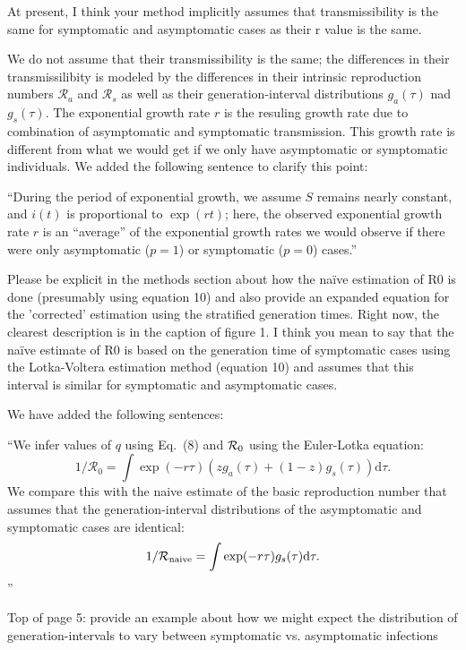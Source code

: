 \documentclass[12pt]{article}
\newcommand{\revtext}{\textsf}
\begin{document}
\revtext{At present, I think your method implicitly assumes that transmissibility is the same for symptomatic and asymptomatic cases as their r value is the same.}

We do not assume that their transmissibility is the same; the differences in their transmissilibity is modeled by the differences in their intrinsic reproduction numbers $\mathcal R_a$ and $\mathcal R_s$ as well as their generation-interval distributions $g_a(\tau)$ nad $g_s(\tau)$. The exponential growth rate $r$ is the resuling growth rate due to combination of asymptomatic and symptomatic transmission. This growth rate is different from what we would get if we only have asymptomatic or symptomatic individuals. We added the following sentence to clarify this point:

``During the period of exponential growth, we assume $S$ remains nearly constant, and $i(t)$ is proportional to $\exp(r t)$;
here, the observed exponential growth rate $r$ is an ``average'' of the exponential growth rates we would observe if there were only asymptomatic ($p=1$) or symptomatic ($p=0$) cases.''

\revtext{Please be explicit in the methods section about how the naïve estimation of R0 is done (presumably using equation 10) and also provide an expanded equation for the 'corrected' estimation using the stratified generation times. Right now, the clearest description is in the caption of figure 1.  I think you mean to say that the naïve estimate of R0 is based on the generation time of symptomatic cases using the Lotka-Voltera estimation method (equation 10) and assumes that this interval is similar for symptomatic and asymptomatic cases.}

We have added the following sentences:

``We infer values of $q$ using Eq.~(8) and ${\cal{R}}_0$ using the Euler-Lotka equation:
\begin{equation}
1/\mathcal R_0 = \int \exp(-r \tau) \left(z g_a(\tau) + (1-z) g_s(\tau)\right) \mathrm{d} \tau.
\end{equation}
We compare this with the naive estimate of the basic reproduction number that assumes that the generation-interval distributions of the asymptomatic and symptomatic cases are identical:
\begin{equation}
1/\mathcal R_{\tiny \textrm{naive}} = \int \exp(-r \tau) g_s(\tau) \mathrm{d} \tau.
\end{equation}''

\revtext{Top of page 5: provide an example about how we might expect the distribution of generation-intervals to vary between symptomatic vs. asymptomatic infections}
\end{document}
